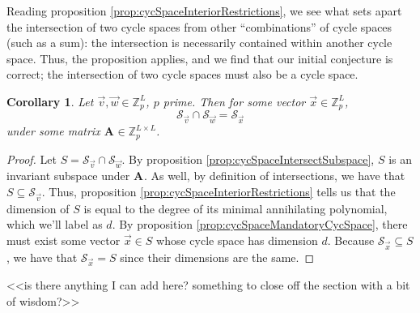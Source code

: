 \documentclass[a4paper, 12pt, reqno]{amsart}
\newtheorem{coro}{Corollary}
\newcommand{\Z}{\mathbb{Z}}
\newcommand\Mat[2][]{\mathbf{#1}^{\!#2}}
\newcommand{\cycsp}[1]{\mathcal{S}_{#1}}
\newcommand{\dq}[1]{``#1''}
\begin{document}
	Reading proposition \ref{prop:cycSpaceInteriorRestrictions}, we see what sets apart the intersection of two cycle spaces from other \dq{combinations} of cycle spaces (such 
	as a sum): the intersection is necessarily contained within another cycle space. Thus, the proposition applies, and we find that our initial conjecture is correct; the
	intersection of two cycle spaces must also be a cycle space.
	
	\begin{coro}
		Let $\vec{v}, \vec{w} \in \Z_p^L$, $p$ prime. Then for some vector $\vec{x} \in \Z_p^L$,
		\[
			\cycsp{\vec{v}} \cap \cycsp{\vec{w}} = \cycsp{\vec{x}}
		\]
		under some matrix $\Mat[A]{} \in \Z_p^{L \times L}$.
	\end{coro}
	\begin{proof}
		Let $S = \cycsp{\vec{v}} \cap \cycsp{\vec{w}}$. By proposition \ref{prop:cycSpaceIntersectSubspace}, $S$ is an invariant subspace under $\Mat[A]{}$. As well, by 
		definition of intersections, we have that $S \subseteq \cycsp{\vec{v}}$. Thus, proposition \ref{prop:cycSpaceInteriorRestrictions} tells us that the dimension of $S$
		is equal to the degree of its minimal annihilating polynomial, which we'll label as $d$. By proposition \ref{prop:cycSpaceMandatoryCycSpace}, there must exist some 
		vector $\vec{x} \in S$ whose cycle space has dimension $d$. Because $\cycsp{\vec{x}} \subseteq S$, we have that $\cycsp{\vec{x}} = S$ since their dimensions are the
		same.
	\end{proof}
	
	<<is there anything I can add here? something to close off the section with a bit of wisdom?>>
	
	
	
\end{document}
